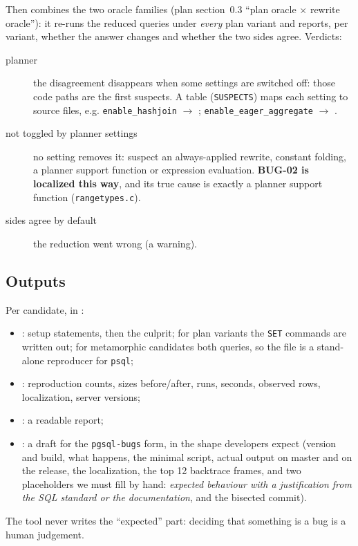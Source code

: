 Then  combines the two oracle families
(plan section~0.3 ``plan oracle $\times$ rewrite oracle''): it re-runs the
reduced queries under \emph{every} plan variant and reports, per variant, whether
the answer changes and whether the two sides agree. Verdicts:
\begin{description}
  \item[planner] the disagreement disappears when some settings are switched
    off: those code paths are the first suspects. A table
    (\texttt{SUSPECTS}) maps each setting to source files, e.g.
    \texttt{enable\_hashjoin} $\rightarrow$ ; \texttt{enable\_eager\_aggregate}
    $\rightarrow$ .
  \item[not toggled by planner settings] no setting removes it: suspect an
    always-applied rewrite, constant folding, a planner support function or
    expression evaluation. \textbf{BUG-02 is localized this way}, and its true
    cause is exactly a planner support function (\texttt{rangetypes.c}).
  \item[sides agree by default] the reduction went wrong (a warning).
\end{description}

\subsection{Outputs}

Per candidate, in :
\begin{itemize}
  \item {}: setup statements, then the culprit; for plan
    variants the \texttt{SET} commands are written out; for metamorphic
    candidates both queries, so the file is a stand-alone reproducer for
    \texttt{psql};
  \item {}: reproduction counts, sizes before/after, runs,
    seconds, observed rows, localization, server versions;
  \item {}: a readable report;
  \item {}: a draft for the \texttt{pgsql-bugs} form,
    in the shape \pg developers expect (version and build, what happens, the
    minimal script, actual output on master and on the release, the
    localization, the top 12 backtrace frames, and two placeholders we must
    fill by hand: \emph{expected behaviour with a justification from the SQL
    standard or the documentation}, and the bisected commit).
\end{itemize}
The tool never writes the ``expected'' part: deciding that something is a bug
is a human judgement.


